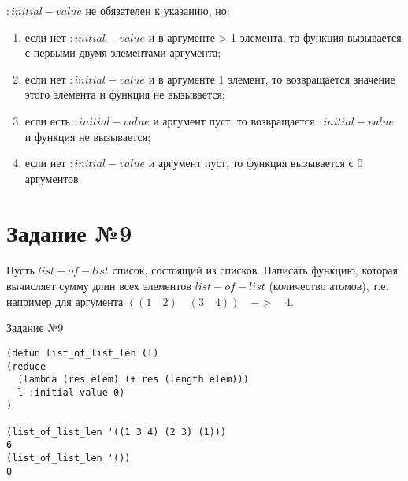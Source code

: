 $:initial-value$ не обязателен к указанию, но:
\begin{enumerate}
	\item если нет $:initial-value$ и в аргументе > 1 элемента, то функция вызывается с первыми двумя элементами аргумента;
	\item если нет $:initial-value$ и в аргументе 1 элемент, то возвращается значение этого элемента и функция не вызывается;
	\item если есть $:initial-value$ и аргумент пуст, то возвращается $:initial-value$ и функция не вызывается;
	\item если нет $:initial-value$ и аргумент пуст, то функция вызывается с 0 аргументов.
\end{enumerate}

\section{Задание №9}
Пусть $list-of-list$ список, состоящий из списков. Написать функцию, которая вычисляет сумму длин всех элементов $list-of-list$ (количество атомов), т.е. например для аргумента $((1 \quad 2) \quad (3 \quad 4)) \quad -> \quad 4$.

\begin{code}
\caption{Задание №9}
\label{code:bf4}
\begin{verbatim}
(defun list_of_list_len (l)
(reduce
  (lambda (res elem) (+ res (length elem)))
  l :initial-value 0)
)

(list_of_list_len '((1 3 4) (2 3) (1)))
6
(list_of_list_len '())
0
\end{verbatim}
\end{code}
